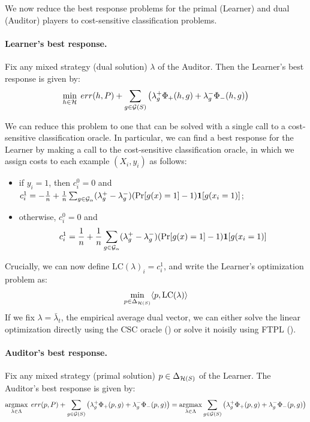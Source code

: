 We now reduce the best response problems for the
primal (Learner) and dual (Auditor) players to cost-sensitive
classification problems.

\paragraph{Learner's best response.} Fix any mixed strategy (dual
solution) $\lambda$ of the Auditor. Then the Learner's best response is given by:
\[\label{eq:br2} \min_{h\in \mathcal{H}} \; err(h, P) + \sum_{g\in \mathcal{G}(S)}
  \left(\lambda_g^+\Phi_+(h, g) + \lambda_g^-\Phi_-(h, g) \right)
\]




We can reduce this problem to one that can be solved with a single
call to a {cost-sensitive classification oracle}. In particular, we
can find a best response for the Learner by making a call to the
cost-sensitive classification oracle, in which we assign costs to each
example $(X_i, y_i)$ as follows:
\begin{itemize}
\item if $y_i = 1$, then $c_i^0 = 0$ and
  $c_i^1 = - \frac{1}{n} + \frac{1}{n} \sum_{g\in
    \mathcal{G}_\alpha}({\lambda}_g^+-{\lambda}_g^-)(\Pr[g(x) =1] -
  1)\textbf{1}[g(x_i=1)]$;
\item otherwise, $c_i^0 = 0$ and
  \begin{align}
    c_i^1 = \frac{1}{n} + \frac{1}{n} \sum_{g\in \mathcal{G}_\alpha}({\lambda}_g^+-{\lambda}_g^-)(\Pr[g(x) =1] - 1)\textbf{1}[g(x_i=1)]
  \end{align}
\end{itemize}

Crucially, we can now define $\text{LC}(\lambda)_i = c_i^{1}$, and write the Learner's optimization problem as:
$$
 \min_{p\in \Delta_{\mathcal{H}(S)}} \langle p, \text{LC}(\lambda) \rangle
$$
If we fix $\lambda = \bar{\lambda}_t$, the empirical average dual vector, we can either solve the linear optimization directly using the CSC oracle () or solve it noisily using FTPL ().
\paragraph{Auditor's best response.}
Fix any mixed strategy (primal solution) $p \in \Delta_{\mathcal{H}(S)}$ of
the Learner. The Auditor's best response is given by:
\begin{equation} \label{eq:abr} \operatorname*{\mathrm{argmax}}_{\lambda \in \Lambda} \;
  err(p, P) + \sum_{g\in \mathcal{G}(S)} \left( \lambda_g^+ \Phi_+(p, g) +
    \lambda_g^- \Phi_-(p, g) \right) = \operatorname*{\mathrm{argmax}}_{\lambda \in \Lambda}
  \sum_{g\in \mathcal{G}(S)} \left( \lambda_g^+ \Phi_+(p, g) + \lambda_g^-
    \Phi_-(p, g) \right)
\end{equation}

